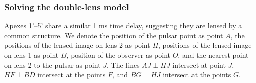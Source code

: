 \documentclass[useAMS,usenatbib]{mn2e}
\begin{document}
\subsubsection{Solving the double-lens model}

Apexes 1'--5' share a similar 1 ms time delay, suggesting they are lensed by
a common structure.
We denote the position of the pulsar point as point $A$, the positions of the lensed image on lens 2 as point $H$, positions of the lensed image on lens 1 as point $B$, position of the observer as point $O$, and the nearest point on lens 2 to the pulsar as point $J$.  
The lines $AJ\perp HJ$ intersect at point $J$, $HF\perp BD$ intersect at the points $F$, and $BG\perp HJ$ intersect at the points $G$.

\end{document}

